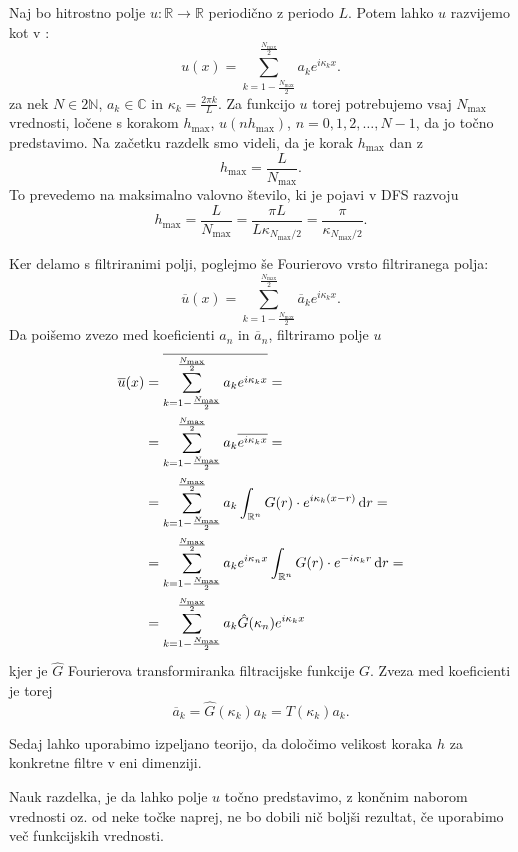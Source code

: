 \documentclass[mat2, tisk]{fmfdelo}
\newcommand{\R}{\mathbb R}
\newcommand{\N}{\mathbb N}
\newcommand{\C}{\mathbb C}
\begin{document}
\noindent
Naj bo hitrostno polje $u: \R \rightarrow \R$ periodično z periodo $L$.
Potem lahko $u$ razvijemo kot v :
$$
u(x) = \sum_{k=1-\frac{N_{\text{max}}}{2}}^{\frac{N_\text{max}}{2}} a_k e^{i\kappa_k x}.
$$
za nek $N \in 2\N$, $a_k \in \C$ in $\kappa_k = \frac{2\pi k}{L}$. 
Za funkcijo $u$ torej potrebujemo vsaj $N_{\text{max}}$ vrednosti, ločene s korakom $h_{\text{max}}$,
$u(n h_{\text{max}})$, $n = 0, 1, 2, \dots, N - 1$, da jo točno predstavimo.
Na začetku razdelk smo videli, da je korak $h_\text{max}$ dan z 
$$
h_\text{max} = \frac{L}{N_\text{max}}.
$$
To prevedemo na maksimalno valovno število, ki je pojavi v DFS razvoju 
$$
h_\text{max} = \frac{L}{N_\text{max}} = \frac{\pi L}{L \kappa_{{N_\text{max}/2}}} = \frac{\pi}{\kappa_{N_\text{max}/2}}.
$$

Ker delamo s filtriranimi polji, poglejmo še Fourierovo vrsto filtriranega polja:
$$
\overline{u}(x) = \sum_{k=1-\frac{N_{\text{max}}}{2}}^{\frac{N_\text{max}}{2}} \overline{a}_k e^{i\kappa_k x}.
$$
Da poišemo zvezo med koeficienti $a_n$ in $\overline{a}_n$, filtriramo polje $u$
\begin{align*}
\overline{u}(x) &= \overline{\sum_{k=1-\frac{N_{\text{max}}}{2}}^{\frac{N_\text{max}}{2}} a_k e^{i\kappa_k x}} = \\
&= \sum_{k=1-\frac{N_{\text{max}}}{2}}^{\frac{N_\text{max}}{2}} a_k \overline{e^{i\kappa_k x}} = \\ 
&= \sum_{k=1-\frac{N_{\text{max}}}{2}}^{\frac{N_\text{max}}{2}} a_k \int_{\R^n} G(r)\cdot e^{i\kappa_k(x - r)} \dif r = \\
&= \sum_{k=1-\frac{N_{\text{max}}}{2}}^{\frac{N_\text{max}}{2}} a_k e^{i\kappa_n x }\int_{\R^n} G(r)\cdot e^{-i\kappa_k r} \dif r =\\
&= \sum_{k=1-\frac{N_{\text{max}}}{2}}^{\frac{N_\text{max}}{2}} a_k \hat{G}(\kappa_n) e^{i\kappa_k x}
\end{align*}
kjer je $\hat{G}$ Fourierova transformiranka filtracijske funkcije $G$. Zveza med koeficienti je torej 
$$
\overline{a}_k = \hat{G}(\kappa_k) a_k = T(\kappa_k) a_k.
$$

Sedaj lahko uporabimo izpeljano teorijo, da določimo velikost koraka $h$ 
za konkretne filtre v eni dimenziji. 

\begin{opomba}
Nauk razdelka, je da lahko polje $u$ točno predstavimo, z končnim naborom 
vrednosti oz. od neke točke naprej, ne bo dobili nič boljši rezultat, če 
uporabimo več funkcijskih vrednosti.
\end{opomba}
\end{document}
